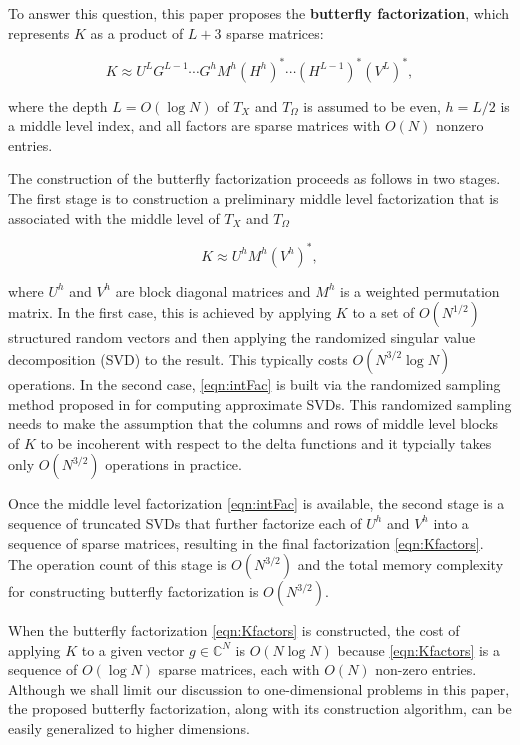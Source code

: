 To answer this question, this paper proposes the {\bf butterfly factorization}, which represents $K$ as a product of $L+3$ sparse matrices:

\begin{equation}
\label{eqn:Kfactors}
K \approx U^{L}G^{L-1}\cdots G^{h} M^h (H^{h})^* \cdots (H^{L-1})^* (V^L)^*,
\end{equation}

where the depth $L=O(\log N)$ of $T_X$ and $T_\Omega$ is assumed to be even, $h=L/2$ is a middle level index, and all factors are sparse matrices with $O(N)$ nonzero entries.

The construction of the butterfly factorization proceeds as follows in two stages. The first stage is to construction a preliminary middle level factorization that is associated with the middle level of $T_X$ and $T_\Omega$

\begin{equation}
  \label{eqn:intFac}
  K\approx U^hM^h (V^h)^*,
\end{equation}

where $U^h$ and $V^h$ are block diagonal matrices and $M^h$ is a weighted permutation matrix. In the first case, this is achieved by applying $K$ to a set of $O(N^{1/2})$ structured random vectors and then applying the randomized singular value decomposition (SVD) to the result. This typically costs $O(N^{3/2}\log N)$ operations. In the second case, \eqref{eqn:intFac} is built via the randomized sampling method proposed in \cite{Butterfly4,symbol3} for computing approximate SVDs. This randomized sampling needs to make the assumption that the columns and rows of middle level blocks of $K$ to be incoherent with respect to the delta functions and it typcially takes only $O(N^{3/2})$ operations in practice.

Once the middle level factorization \eqref{eqn:intFac} is available, the second stage is a sequence of truncated SVDs that further factorize each of $U^h$ and $V^h$ into a sequence of sparse matrices, resulting in the final factorization \eqref{eqn:Kfactors}. The operation count of this stage is $O(N^{3/2})$ and the total memory complexity for constructing butterfly factorization is $O(N^{3/2})$.

When the butterfly factorization \eqref{eqn:Kfactors} is constructed, the cost of applying $K$ to a given vector $g\in\mathbb{C}^N$ is $O(N\log
N)$ because \eqref{eqn:Kfactors} is a sequence of $O(\log N)$ sparse matrices, each with $O(N)$ non-zero entries.  Although we shall limit our discussion to one-dimensional problems in this paper, the proposed butterfly factorization, along with its construction algorithm, can be easily generalized to higher dimensions.

